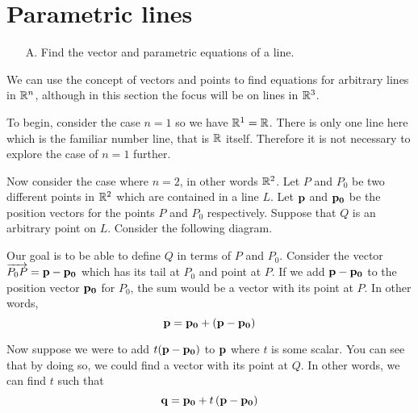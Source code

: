 \section{Parametric lines}

\begin{outcome}

\begin{enumerate}

\item[A.] Find the vector and parametric equations of a line.

\end{enumerate}
\end{outcome}

We can use the concept of vectors and points to find equations for arbitrary lines in $\mathbb{R}^n$, although in this section the focus will be on lines in $\mathbb{R}^3$. 

To begin, consider the case $n=1$ so we have $\mathbb{R}^{1}=\mathbb{R}$. There is only one line here which is the familiar number line, that is $\mathbb{R}$ itself. Therefore it is not necessary to explore the case of $n=1$ further. 

Now consider the case where $n=2$, in other words $\mathbb{R}^2$.  Let $P $ and $P_0$ be
two different points in $\mathbb{R}^{2}$ which are contained in a line
$L$. Let ${\bf p}$ and ${\bf p_0}$ be the position vectors for the points $P$ and $P_0$
respectively. Suppose that $Q$ is an arbitrary point on $L$. Consider the following
diagram.

\begin{center}
\end{center}

Our goal is to be able to define $Q$ in terms of $P$  and $P_0$. Consider the vector $\overrightarrow{P_0P} = {\bf p} - {\bf p_0}$ which
has its tail at $P_0$ and point at $P$. If we add ${\bf p} - {\bf p_0}$ to the position vector ${\bf p_0}$ for $P_0$,  
the sum would be a vector with its point at $P$. 
In other words,
\begin{equation*}
{\bf p} = {\bf p_0} + ({\bf p} - {\bf p_0})
\end{equation*}

Now suppose we were to add $t({\bf p} - {\bf p_0})$ to ${\bf p}$ where $t$ is some scalar.
You can see that by doing so, we could find a vector with its point at $Q$. In other words, we can find $t$ such that 
\begin{equation*}
{\bf q} = {\bf p_0} + t \left( {\bf p}- {\bf p_0}\right)
\end{equation*}

